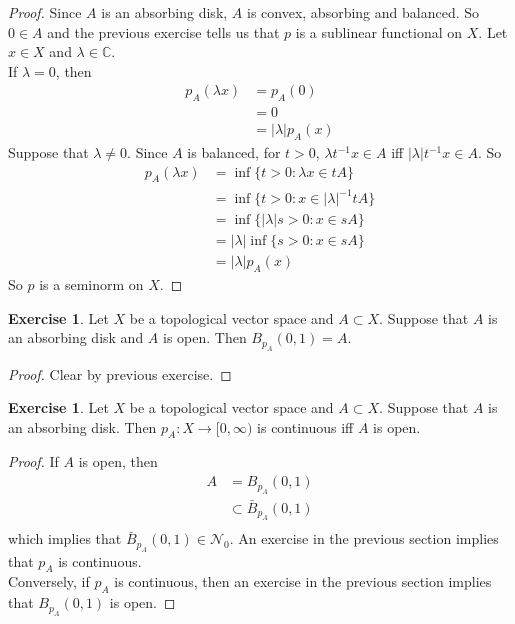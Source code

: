 \documentclass[12pt]{amsart}
\theoremstyle{definition}
\newtheorem{ex}[definition]{Exercise}
\newcommand{\lam}{\lambda}
\newcommand{\C}{\mathbb{C}}
\newcommand{\MN}{\mathcal{N}}
\newcommand{\Rg}{[0,\infty)}
\begin{document}
	\begin{proof} Since $A$ is an absorbing disk, $A$ is convex, absorbing and balanced. So $0 \in A$ and the previous exercise tells us that $p$ is a sublinear functional on $X$. Let $x\in X$ and $\lam \in \C$. \\
		If $\lam =0$, then 
				\begin{align*}
					p_A(\lam x) 
					&= p_A(0) \\
					&= 0 \\
					&= |\lam| p_A(x)
				\end{align*}
		Suppose that $\lam \neq 0$. Since $A$ is balanced, for $t >0$, $\lam t^{-1} x \in A$ iff $|\lam| t^{-1} x \in A$. So
				\begin{align*}
					p_A(\lam x) 
					&= \inf \{t > 0: \lam x \in tA\} \\
					&= \inf \{t > 0: x \in |\lam|^{-1} tA\} \\
					&= \inf \{|\lam| s > 0: x \in sA\} \\
					&= |\lam|\inf \{ s > 0: x \in sA\} \\
					&= |\lam | p_A(x)
				\end{align*}
	So $p$ is a seminorm on $X$.
	\end{proof}
	
	\begin{ex}
		Let $X$ be a topological vector space and $A \subset X$. Suppose that $A$ is an absorbing disk and $A$ is open. Then $B_{p_A}(0, 1) = A$.
	\end{ex}

	\begin{proof}
		Clear by previous exercise.
	\end{proof}

	\begin{ex}
		Let $X$ be a topological vector space and $A \subset X$. Suppose that $A$ is an absorbing disk. Then $p_A:X \rightarrow \Rg$ is continuous iff $A$ is open. 
	\end{ex}

	\begin{proof}
		If $A$ is open, then 
		\begin{align*}
			A 
			&= B_{p_A}(0,1) \\
			& \subset \bar{B}_{p_A}(0,1) \\
		\end{align*}
		which implies that $\bar{B}_{p_A}(0,1) \in \MN_0$. An exercise in the previous section implies that $p_A$ is continuous. \\
		Conversely, if $p_A$ is continuous, then an exercise in the previous section implies that $B_{p_A}(0,1)$ is open. 
	\end{proof}
	
\end{document}
